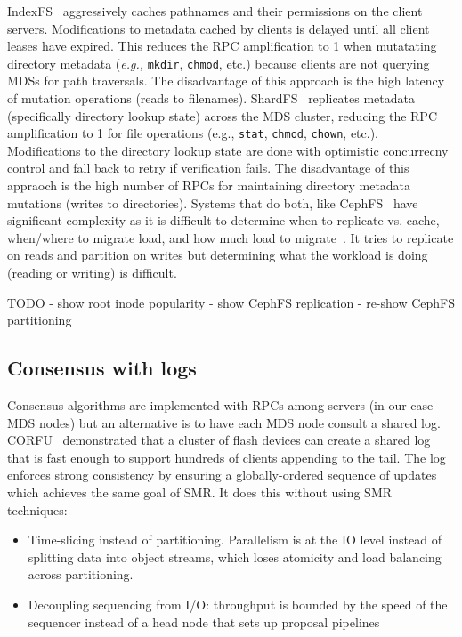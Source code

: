 \documentclass[conference]{acm_proc_article-sp} \usepackage[english]{babel}
\begin{document}
IndexFS~\cite{ren:sc2014-indexfs} aggressively caches pathnames and their
permissions on the client servers. Modifications to metadata cached by clients
is delayed until all client leases have expired. This reduces the RPC
amplification to 1 when mutatating directory metadata ({\it e.g.,}
\texttt{mkdir}, \texttt{chmod}, etc.) because clients are not querying MDSs for
path traversals. The disadvantage of this approach is the high latency of
mutation operations (reads to filenames).  ShardFS~\cite{xiao:socc2015-shardfs}
replicates metadata (specifically directory lookup state) across the MDS
cluster, reducing the RPC amplification to 1 for file operations ({e.g.,}
\texttt{stat}, \texttt{chmod}, \texttt{chown}, etc.). Modifications to the
directory lookup state are done with optimistic concurrecny control and fall
back to retry if verification fails. The disadvantage of this appraoch is the
high number of RPCs for maintaining directory metadata mutations (writes to
directories).  Systems that do both, like
CephFS~\cite{weil:sc2004-dyn-metadata, weil:osdi2006-ceph} have significant
complexity as it is difficult to determine when to replicate vs. cache,
when/where to migrate load, and how much load to
migrate~\cite{sevilla:sc2015-mantle}. It tries to replicate on reads and
partition on writes but determining what the workload is doing (reading or
writing) is difficult.





TODO
- show root inode popularity
- show CephFS replication
- re-show CephFS partitioning

\subsection{Consensus with logs}

Consensus algorithms are implemented with RPCs among servers (in our case MDS
nodes) but an alternative is to have each MDS node consult a shared log.
CORFU~\cite{balakrishnan:nsdi12-corfu} demonstrated that a cluster of flash devices can create a
shared log that is fast enough to support hundreds of clients appending to the
tail. The log enforces strong consistency by ensuring a globally-ordered sequence of updates which achieves the same goal of SMR. It does this without using SMR techniques:
\begin{itemize}
	\item Time-slicing instead of partitioning. Parallelism
    is at the IO level instead of splitting data into object streams, which loses
    atomicity and load balancing across partitioning.
    \item Decoupling sequencing from I/O: throughput is bounded by the speed of
    the sequencer instead of a head node that sets up proposal pipelines
\end{itemize}
\end{document}
